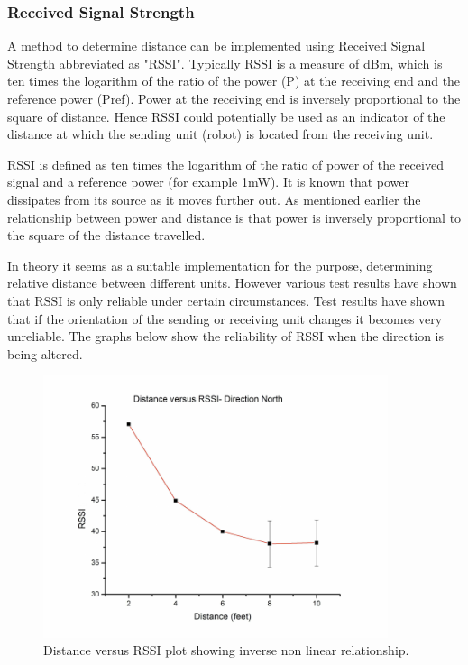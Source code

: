 \documentclass[10pt,a4paper]{article}
\begin{document}
\subsubsection{Received Signal Strength}
A method to determine distance can be implemented using Received Signal Strength abbreviated as "RSSI". Typically RSSI is a measure of dBm, which is ten times the logarithm of the ratio of the power (P) at the receiving end and the reference power (Pref). Power at the receiving end is inversely proportional to the square of distance.\cite{RSSI} Hence RSSI could potentially be used as an indicator of the distance at which the sending unit (robot) is located from the receiving unit.\cite{RSSI}

RSSI is defined as ten times the logarithm of the ratio of power of the received signal and a reference power (for example 1mW). It is known that power dissipates from its source as it moves further out. As mentioned earlier the relationship between power and distance is that power is inversely proportional to the square of the distance travelled. \cite{RSSI}

In theory it seems as a suitable implementation for the purpose, determining relative distance between different units. However various test results have shown that RSSI is only reliable under certain circumstances. Test results have shown that if the orientation of the sending or receiving unit changes it becomes very unreliable. The graphs below show the reliability of RSSI when the direction is being altered.\cite{RSSI}

\begin{figure}[H]
\centering
\includegraphics[width=0.9\textwidth]{North.pdf}
\caption{Distance versus RSSI plot showing inverse non linear
relationship.\cite{RSSI}}
\label{North}
\end{figure}
\end{document}
